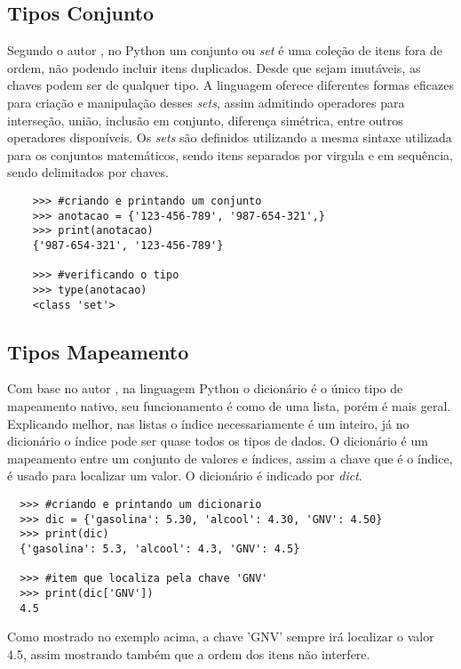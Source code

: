             \subsection{Tipos Conjunto}
	Segundo o autor \cite{Perkovic2016}, no Python um conjunto ou \textit{set} é uma coleção de itens fora de ordem, não podendo incluir itens duplicados. Desde que sejam imutáveis, as chaves podem ser de qualquer tipo. A linguagem oferece diferentes formas eficazes para criação e manipulação desses \textit{sets}, assim admitindo operadores para interseção, união, inclusão em conjunto, diferença simétrica, entre outros operadores disponíveis. Os \textit{sets} são definidos utilizando a mesma sintaxe utilizada para os conjuntos matemáticos, sendo itens separados por virgula e em sequência, sendo delimitados por chaves.
	\begin{lstlisting}
	>>> #criando e printando um conjunto
	>>> anotacao = {'123-456-789', '987-654-321',}
	>>> print(anotacao)
	{'987-654-321', '123-456-789'}
		
	>>> #verificando o tipo
	>>> type(anotacao)
	<class 'set'>
	\end{lstlisting}
	
            \subsection{Tipos Mapeamento}
	Com base no autor \cite{Severance2016}, na linguagem Python o dicionário é o único tipo de mapeamento nativo, seu funcionamento é como de uma lista, porém é mais geral. Explicando melhor, nas listas o índice necessariamente é um inteiro, já no dicionário o índice pode ser quase todos os tipos de dados. O dicionário é um mapeamento entre um conjunto de valores e índices, assim a chave que é o índice, é usado para localizar um valor. O dicionário é indicado por \textit{dict}.
		\begin{lstlisting}
  >>> #criando e printando um dicionario
  >>> dic = {'gasolina': 5.30, 'alcool': 4.30, 'GNV': 4.50}
  >>> print(dic)
  {'gasolina': 5.3, 'alcool': 4.3, 'GNV': 4.5}
  
  >>> #item que localiza pela chave 'GNV'
  >>> print(dic['GNV'])
  4.5
	\end{lstlisting}
	Como mostrado no exemplo acima, a chave 'GNV' sempre irá localizar o valor 4.5, assim mostrando também que a ordem dos itens não interfere.

